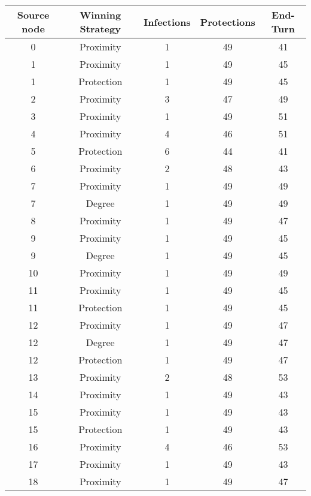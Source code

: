 \documentclass[results.tex]{subfiles}
\begin{document}
\begin{center}
  \begin{tabular}{| c || c | c | c | c |}
    \hline
    {\bfseries Source node} & {\bfseries Winning Strategy} & {\bfseries Infections} & {\bfseries Protections} & {\bfseries End-Turn} \\  %
    \hline\hline
    0 & Proximity & 1 & 49 & 41 \\ 
    \hline
    1 & Proximity & 1 & 49 & 45 \\ 
    \hline
    1 & Protection & 1 & 49 & 45 \\ 
    \hline
    2 & Proximity & 3 & 47 & 49 \\ 
    \hline
    3 & Proximity & 1 & 49 & 51 \\ 
    \hline
    4 & Proximity & 4 & 46 & 51 \\ 
    \hline
    5 & Protection & 6 & 44 & 41 \\ 
    \hline
    6 & Proximity & 2 & 48 & 43 \\ 
    \hline
    7 & Proximity & 1 & 49 & 49 \\ 
    \hline
    7 & Degree & 1 & 49 & 49 \\ 
    \hline
    8 & Proximity & 1 & 49 & 47 \\ 
    \hline
    9 & Proximity & 1 & 49 & 45 \\ 
    \hline
    9 & Degree & 1 & 49 & 45 \\ 
    \hline
    10 & Proximity & 1 & 49 & 49 \\ 
    \hline
    11 & Proximity & 1 & 49 & 45 \\ 
    \hline
    11 & Protection & 1 & 49 & 45 \\ 
    \hline
    12 & Proximity & 1 & 49 & 47 \\ 
    \hline
    12 & Degree & 1 & 49 & 47 \\ 
    \hline
    12 & Protection & 1 & 49 & 47 \\ 
    \hline
    13 & Proximity & 2 & 48 & 53 \\ 
    \hline
    14 & Proximity & 1 & 49 & 43 \\ 
    \hline
    15 & Proximity & 1 & 49 & 43 \\ 
    \hline
    15 & Protection & 1 & 49 & 43 \\ 
    \hline
    16 & Proximity & 4 & 46 & 53 \\ 
    \hline
    17 & Proximity & 1 & 49 & 43 \\ 
    \hline
    18 & Proximity & 1 & 49 & 47 \\ 

\end{tabular}
\end{center}
\end{document}
